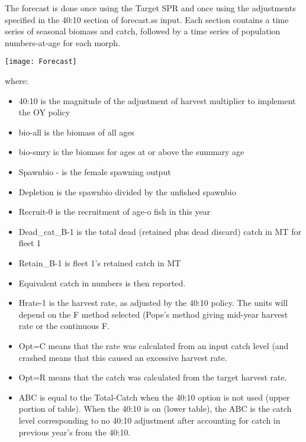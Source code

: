 \begin{landscape}
	The forecast is done once using the Target SPR and once using the adjustments specified in the 40:10 section of forecast.ss input.  Each section contains a time series of seasonal biomass and catch, followed by a time series of population numbers-at-age for each morph.
	
	\begin{center}
		\texttt{[image: Forecast]}
	\end{center}
\end{landscape}

where:
\begin{itemize}
	\item 40:10 is the magnitude of the adjustment of harvest multiplier to implement the OY policy
	\item bio-all is the biomass of all ages
	\item bio-smry is the biomass for ages at or above the summary age
	\item Spawnbio - is the female spawning output
	\item Depletion is the spawnbio divided by the unfished spawnbio
	\item Recruit-0 is the recruitment of age-o fish in this year
	\item Dead\_cat\_B-1 is the total dead (retained plus dead discard) catch in MT for fleet 1
	\item Retain\_B-1 is fleet 1’s retained catch in MT
	\item Equivalent catch in numbers is then reported.
	\item Hrate-1 is the harvest rate, as adjusted by the 40:10 policy.  The units will depend on the F method selected (Pope’s method giving mid-year harvest rate or the continuous F.
	\item Opt=C means that the rate was calculated from an input catch level (and crashed means that this caused an excessive harvest rate.
	\item Opt=R means that the catch was calculated from the target harvest rate.
	\item ABC is equal to the Total-Catch when the 40:10 option is not used (upper portion of table).  When the 40:10 is on (lower table), the ABC is the catch level corresponding to no 40:10 adjustment after accounting for catch in previous year’s from the 40:10.
\end{itemize}

